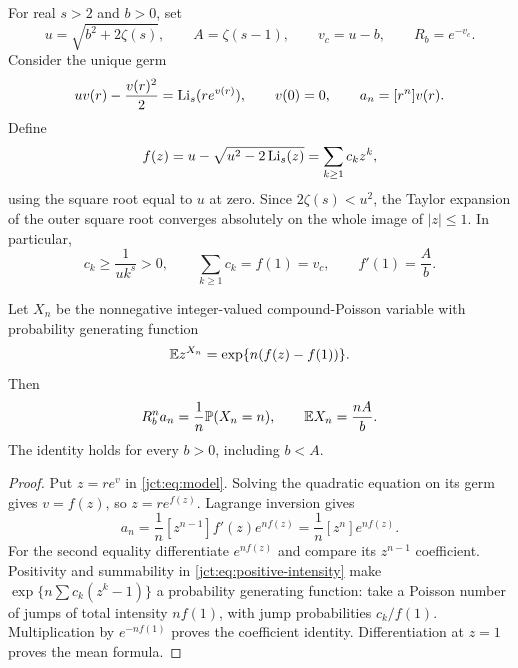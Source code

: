 For real $s>2$ and $b>0$, set
\begin{equation}\label{jct:eq:parameters}
 u=\sqrt{b^2+2\zeta(s)},\qquad
 A=\zeta(s-1),\qquad v_c=u-b,\qquad R_b=e^{-v_c}.
\end{equation}
Consider the unique germ
\begin{equation}\label{jct:eq:model}
 uv(r)-\frac{v(r)^2}{2}=\operatorname{Li}_s(re^{v(r)}),\qquad v(0)=0,
 \qquad a_n=[r^n]v(r).
\end{equation}
Define
\begin{equation}\label{jct:eq:f}
 f(z)=u-\sqrt{u^2-2\operatorname{Li}_s(z)}=\sum_{k\ge1}c_kz^k,
\end{equation}
using the square root equal to $u$ at zero. Since
$2\zeta(s)<u^2$, the Taylor expansion of the outer square root converges
absolutely on the whole image of $|z|\le1$. In particular,
\begin{equation}\label{jct:eq:positive-intensity}
 c_k\ge\frac1{u k^s}>0,\qquad
 \sum_{k\ge1}c_k=f(1)=v_c,\qquad f'(1)=\frac Ab.
\end{equation}

\begin{proposition}
\label{jct:prop:poisson}
Let $X_n$ be the nonnegative integer-valued compound-Poisson variable
with probability generating function
\begin{equation}\label{jct:eq:pgf}
 \mathbb E z^{X_n}=\exp\{n(f(z)-f(1))\}.
\end{equation}
Then
\begin{equation}\label{jct:eq:probability-identity}
 R_b^n a_n=\frac1n\mathbb{P}(X_n=n),\qquad
 \mathbb E X_n=\frac{nA}{b}.
\end{equation}
The identity holds for every $b>0$, including $b<A$.
\end{proposition}

\begin{proof}
Put $z=re^{v}$ in \eqref{jct:eq:model}. Solving the quadratic equation
on its germ gives $v=f(z)$, so $z=re^{f(z)}$. Lagrange inversion gives
\[
 a_n=\frac1n[z^{n-1}]f'(z)e^{nf(z)}
     =\frac1n[z^n]e^{nf(z)}.
\]
For the second equality differentiate $e^{nf(z)}$ and compare its
$z^{n-1}$ coefficient. Positivity and summability in
\eqref{jct:eq:positive-intensity} make
$\exp\{n\sum c_k(z^k-1)\}$ a probability generating function:
take a Poisson number of jumps of total intensity $nf(1)$, with
jump probabilities $c_k/f(1)$. Multiplication by $e^{-nf(1)}$
proves the coefficient identity. Differentiation at $z=1$ proves
the mean formula.
\end{proof}

